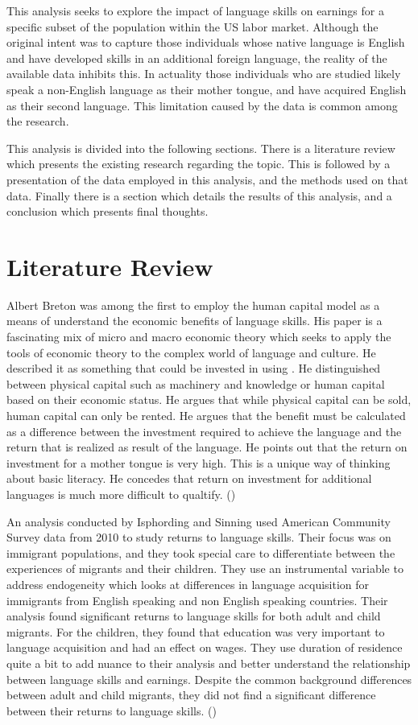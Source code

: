 \documentclass[12pt,english]{article}
\begin{document}
This analysis seeks to explore the impact of language skills on earnings for a specific subset of the population within the US labor market. Although the original intent was to capture those individuals whose native language is English and have developed skills in an additional foreign language, the reality of the available data inhibits this. In actuality those individuals who are studied likely speak a non-English language as their mother tongue, and have acquired English as their second language. This limitation caused by the data is common among the research.

This analysis is divided into the following sections. There is a literature review which presents the existing research regarding the topic. This is followed by a presentation of the data employed in this analysis, and the methods used on that data. Finally there is a section which details the results of this analysis, and a conclusion which presents final thoughts. 

\section{Literature Review}\label{sec:litreview}

Albert Breton was among the first to employ the human capital model as a means of understand the economic benefits of language skills. His paper is a fascinating mix of micro and macro economic theory which seeks to apply the tools of economic theory to the complex world of language and culture. He described it as something that could be invested in using . He distinguished between physical capital such as machinery and knowledge or human capital based on their economic status. He argues that while physical capital can be sold, human capital can only be rented. He argues that the benefit must be calculated as a difference between the investment required to achieve the language and the return that is realized as result of the language. He points out that the return on investment for a mother tongue is very high. This is a unique way of thinking about basic literacy. He concedes that return on investment for additional languages is much more difficult to qualtify. (\citet{Canada})


An analysis conducted by Isphording and Sinning used American Community Survey data from 2010 to study returns to language skills. Their focus was on immigrant populations, and they took special care to differentiate between the experiences of migrants and their children. They use an instrumental variable to address endogeneity which looks at differences in language acquisition for immigrants from English speaking and non English speaking countries. Their analysis found significant returns to language skills for both adult and child migrants. For the children, they found that education was very important to language acquisition and had an effect on wages. They use duration of residence quite a bit to add nuance to their analysis and better understand the relationship between language skills and earnings. Despite the common background differences between adult and child migrants, they did not find a significant difference between their returns to language skills.  (\citet{Rhur})
\end{document}

